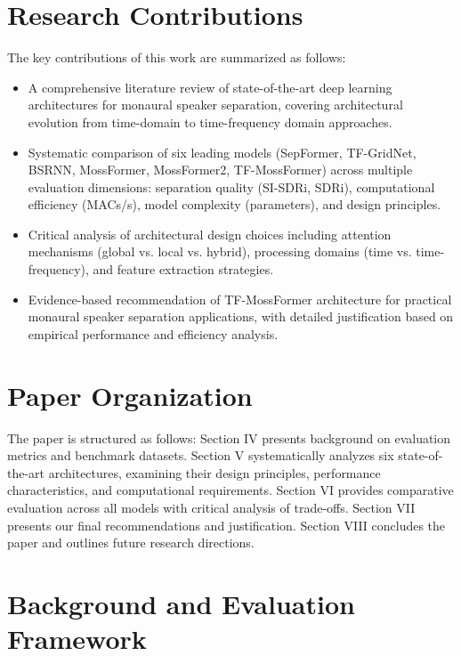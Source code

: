 \documentclass[conference]{IEEEtran}
\begin{document}
\section{Research Contributions}

The key contributions of this work are summarized as follows:

\begin{itemize}
    \item A comprehensive literature review of state-of-the-art deep learning architectures for monaural speaker separation, covering architectural evolution from time-domain to time-frequency domain approaches.
    
    \item Systematic comparison of six leading models (SepFormer, TF-GridNet, BSRNN, MossFormer, MossFormer2, TF-MossFormer) across multiple evaluation dimensions: separation quality (SI-SDRi, SDRi), computational efficiency (MACs/s), model complexity (parameters), and design principles.
    
    \item Critical analysis of architectural design choices including attention mechanisms (global vs. local vs. hybrid), processing domains (time vs. time-frequency), and feature extraction strategies.
    
    \item Evidence-based recommendation of TF-MossFormer architecture for practical monaural speaker separation applications, with detailed justification based on empirical performance and efficiency analysis.
\end{itemize}

\section{Paper Organization}

The paper is structured as follows: Section IV presents background on evaluation metrics and benchmark datasets. Section V systematically analyzes six state-of-the-art architectures, examining their design principles, performance characteristics, and computational requirements. Section VI provides comparative evaluation across all models with critical analysis of trade-offs. Section VII presents our final recommendations and justification. Section VIII concludes the paper and outlines future research directions.

\section{Background and Evaluation Framework}
\end{document}
